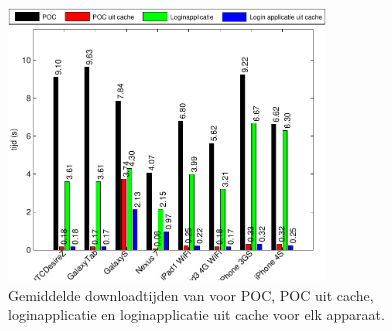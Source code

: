 % 


\section*{\kendo}
\label{app:performantie-kendo}

\begin{figure}
  \centering
  \includegraphics[width=0.75\textwidth]{figuren/performance-kendo.pdf}
  \caption{Gemiddelde downloadtijden van \kendo{} voor POC,  POC uit cache,  loginapplicatie en loginapplicatie uit cache voor elk apparaat.}
  \label{fig:performantie-kendo}
\end{figure}

